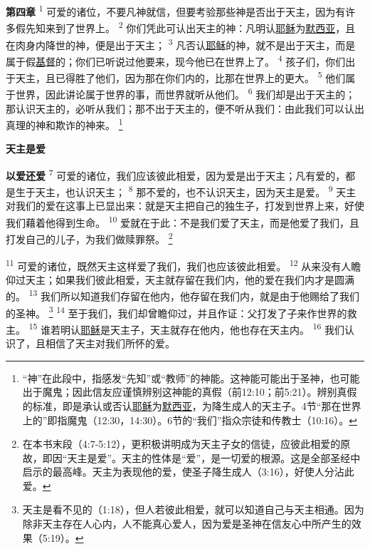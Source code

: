 \textbf{第四章\quad}
\textsuperscript{1}
可爱的诸位，不要凡神就信，但要考验那些神是否出于天主，因为有许多假先知来到了世界上。
\textsuperscript{2}
你们凭此可认出天主的神：凡明认\uline{耶稣}为\uline{默西亚}，且在肉身内降世的神，便是出于天主；
\textsuperscript{3}
凡否认\uline{耶稣}的神，就不是出于天主，而是属于假\uline{基督}的；你们已听说过他要来，现今他已在世界上了。
\textsuperscript{4}
孩子们，你们出于天主，且已得胜了他们，因为那在你们内的，比那在世界上的更大。
\textsuperscript{5}
他们属于世界，因此讲论属于世界的事，而世界就听从他们。
\textsuperscript{6}
我们却是出于天主的；那认识天主的，必听从我们；那不出于天主的，便不听从我们：由此我们可以认出真理的神和欺诈的神来。
\footnote{“神”在此段中，指感发“先知”或“教师”的神能。这神能可能出于圣神，也可能出于魔鬼；因此信友应谨慎辨别这神能的真假（前12:10；前5:21）。辨别真假的标准，即是承认或否认\uline{耶稣}为\uline{默西亚}，为降生成人的天主子。4节“那在世界上的”即指魔鬼（12:30，14:30）。6节的“我们”指众宗徒和传教士（10:16）。}

\begin{center}
	\textbf{\large{\songti 天主是爱}}
\end{center}

\textbf{以爱还爱\quad}
\textsuperscript{7}
可爱的诸位，我们应该彼此相爱，因为爱是出于天主；凡有爱的，都是生于天主，也认识天主；
\textsuperscript{8}
那不爱的，也不认识天主，因为天主是爱。
\textsuperscript{9}
天主对我们的爱在这事上已显出来：就是天主把自己的独生子，打发到世界上来，好使我们藉着他得到生命。
\textsuperscript{10}
爱就在于此：不是我们爱了天主，而是他爱了我们，且打发自己的儿子，为我们做赎罪祭。
\footnote{在本书末段（4:7-5:12），更积极讲明成为天主子女的信徒，应彼此相爱的原故，即因“天主是爱”。天主的性体是“爱”，是一切爱的根源。这是全部圣经中启示的最高峰。天主为表现他的爱，使圣子降生成人（3:16），好使人分沾此爱。}

\textsuperscript{11}
可爱的诸位，既然天主这样爱了我们，我们也应该彼此相爱。
\textsuperscript{12}
从来没有人瞻仰过天主；如果我们彼此相爱，天主就存留在我们内，他的爱在我们内才是圆满的。
\textsuperscript{13}
我们所以知道我们存留在他内，他存留在我们内，就是由于他赐给了我们的圣神。
\footnote{天主是看不见的（1:18），但人若彼此相爱，就可以知道自己与天主相通。因为除非天主存在人心内，人不能真心爱人，因为爱是圣神在信友心中所产生的效果（5:19）。}
\textsuperscript{14}
至于我们，我们却曾瞻仰过，并且作证：父打发了子来作世界的救主。
\textsuperscript{15}
谁若明认\uline{耶稣}是天主子，天主就存在他内，他也存在天主内。
\textsuperscript{16}
我们认识了，且相信了天主对我们所怀的爱。

